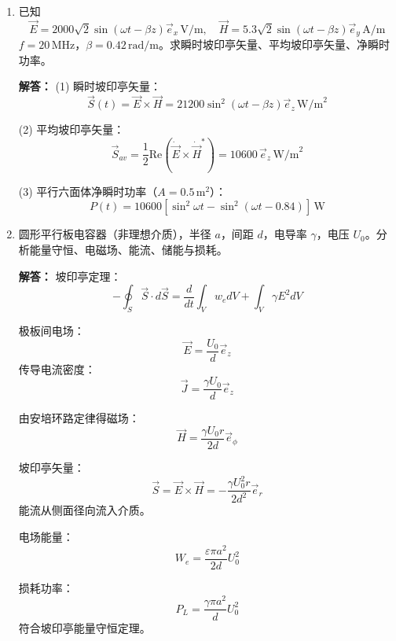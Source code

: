 \begin{enumerate}[label=\arabic*.]
理想导体边界切向电场为零：
\[
\vec{E}_t = 0
\]

\vspace{1em}

\item 已知
\[
\vec{E} = 2000\sqrt{2}\sin(\omega t-\beta z)\vec{e}_x\,\text{V/m}, \quad
\vec{H} = 5.3\sqrt{2}\sin(\omega t-\beta z)\vec{e}_y\,\text{A/m}
\]
\(f=20\,\text{MHz}\)，\(\beta=0.42\,\text{rad/m}\)。求瞬时坡印亭矢量、平均坡印亭矢量、净瞬时功率。

\textbf{解答：}
(1) 瞬时坡印亭矢量：
\[
\vec{S}(t) = \vec{E}\times\vec{H}
= 21200\sin^2(\omega t-\beta z)\vec{e}_z \,\text{W/m}^2
\]

(2) 平均坡印亭矢量：
\[
\vec{S}_{av} = \frac{1}{2}\text{Re}\left(\dot{\vec{E}}\times\dot{\vec{H}}^*\right)
= 10600\,\vec{e}_z \,\text{W/m}^2
\]

(3) 平行六面体净瞬时功率（\(A=0.5\,\text{m}^2\)）：
\[
P(t) = 10600\left[\sin^2\omega t - \sin^2(\omega t-0.84)\right]\,\text{W}
\]

\vspace{1em}

\item 圆形平行板电容器（非理想介质），半径 \(a\)，间距 \(d\)，电导率 \(\gamma\)，电压 \(U_0\)。分析能量守恒、电磁场、能流、储能与损耗。

\textbf{解答：}
坡印亭定理：
\[
-\oint_S \vec{S}\cdot d\vec{S} = \frac{d}{dt}\int_V w_e dV + \int_V \gamma E^2 dV
\]

极板间电场：
\[
\vec{E} = \frac{U_0}{d}\vec{e}_z
\]
传导电流密度：
\[
\vec{J} = \frac{\gamma U_0}{d}\vec{e}_z
\]

由安培环路定律得磁场：
\[
\vec{H} = \frac{\gamma U_0 r}{2d}\vec{e}_\phi
\]

坡印亭矢量：
\[
\vec{S} = \vec{E}\times\vec{H}
= -\frac{\gamma U_0^2 r}{2d^2}\vec{e}_r
\]
能流从侧面径向流入介质。

电场能量：
\[
W_e = \frac{\varepsilon \pi a^2}{2d}U_0^2
\]

损耗功率：
\[
P_L = \frac{\gamma \pi a^2}{d}U_0^2
\]
符合坡印亭能量守恒定理。

\end{enumerate}